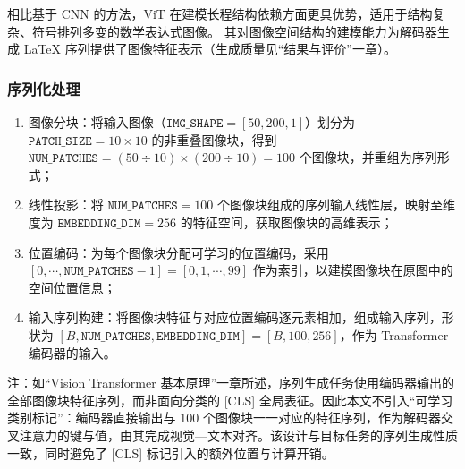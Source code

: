 相比基于 CNN 的方法，ViT 在建模长程结构依赖方面更具优势，适用于结构复杂、符号排列多变的数学表达式图像。
其对图像空间结构的建模能力为解码器生成 LaTeX 序列提供了图像特征表示（生成质量见“结果与评价”一章）。

\subsubsection{序列化处理}
\begin{enumerate}[label={（\arabic*）}, leftmargin=2em, labelsep=0.5em, itemsep=0pt]
    \item 图像分块：将输入图像（$\texttt{IMG\_SHAPE}=[50, 200, 1]$）划分为 $\texttt{PATCH\_SIZE}=10 \times 10$ 的非重叠图像块，得到 $\texttt{NUM\_PATCHES}=(50 \div 10) \times (200 \div 10) = 100$ 个图像块，并重组为序列形式；
    \item 线性投影：将 $\texttt{NUM\_PATCHES}=100$ 个图像块组成的序列输入线性层，映射至维度为 $\texttt{EMBEDDING\_DIM}=256$ 的特征空间，获取图像块的高维表示；
    \item 位置编码：为每个图像块分配可学习的位置编码，采用 $[0, \cdots, \texttt{NUM\_PATCHES}-1]=[0, 1, \cdots, 99]$ 作为索引，以建模图像块在原图中的空间位置信息；
    \item 输入序列构建：将图像块特征与对应位置编码逐元素相加，组成输入序列，形状为 $[B, \texttt{NUM\_PATCHES}, \texttt{EMBEDDING\_DIM}] = [B, 100, 256]$，作为 Transformer 编码器的输入。
\end{enumerate}
注：如“Vision Transformer 基本原理”一章所述，序列生成任务使用编码器输出的全部图像块特征序列，而非面向分类的 [CLS] 全局表征。因此本文不引入“可学习类别标记”：编码器直接输出与 $100$ 个图像块一一对应的特征序列，作为解码器交叉注意力的键与值，由其完成视觉—文本对齐。该设计与目标任务的序列生成性质一致，同时避免了 [CLS] 标记引入的额外位置与计算开销。
